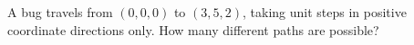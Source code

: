 A bug travels from $(0,0,0)$ to $(3,5,2)$, taking unit steps in positive coordinate directions only. How many different paths are possible?

